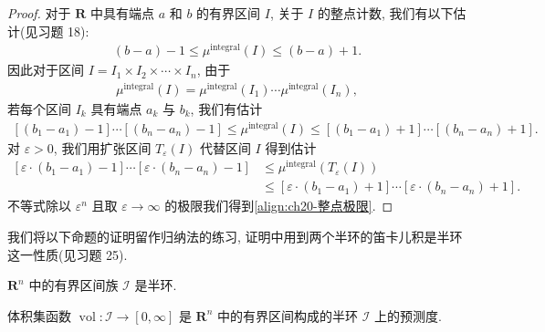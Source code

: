 \documentclass[../../main.tex]{subfiles}
\begin{document}
\begin{proof}
对于 $\mathbf{R}$ 中具有端点 $a$ 和 $b$ 的有界区间 $I$, 关于 $I$ 的整点计数, 我们有以下估计(见习题 18):
\begin{align}\label{align:ch20-一维整点估计}
(b-a)-1\leqslant\mu^{\operatorname{integral}}(I)\leqslant(b-a)+1.
\end{align}
因此对于区间 $I=I_{1}\times I_{2}\times\cdots\times I_{n}$, 由于
\begin{align*}
\mu^{\operatorname{integral}}(I)=\mu^{\operatorname{integral}}(I_{1})\cdots\mu^{\operatorname{integral}}(I_{n}),
\end{align*}
若每个区间 $I_{k}$ 具有端点 $a_{k}$ 与 $b_{k}$, 我们有估计
\begin{align}\label{align:ch20-n维整点估计}
[(b_{1}-a_{1})-1]\cdots[(b_{n}-a_{n})-1]\leqslant\mu^{\operatorname{integral}}(I)\leqslant[(b_{1}-a_{1})+1]\cdots[(b_{n}-a_{n})+1].
\end{align}
对 $\varepsilon>0$, 我们用扩张区间 $T_{\varepsilon}(I)$ 代替区间 $I$ 得到估计
\begin{align}\label{align:ch20-扩张整点估计}
[\varepsilon\cdot(b_{1}-a_{1})-1]\cdots[\varepsilon\cdot(b_{n}-a_{n})-1]&\leqslant\mu^{\operatorname{integral}}(T_{\varepsilon}(I))\\
&\leqslant[\varepsilon\cdot(b_{1}-a_{1})+1]\cdots[\varepsilon\cdot(b_{n}-a_{n})+1].\nonumber
\end{align}
不等式除以 $\varepsilon^{n}$ 且取 $\varepsilon\to\infty$ 的极限我们得到\eqref{align:ch20-整点极限}.
\end{proof}

我们将以下命题的证明留作归纳法的练习, 证明中用到两个半环的笛卡儿积是半环这一性质(见习题 25).

\begin{proposition}\label{proposition:ch20-区间半环}
$\mathbf{R}^{n}$ 中的有界区间族 $\mathcal{I}$ 是半环.
\end{proposition}

\begin{proposition}\label{proposition:ch20-体积预测度}
体积集函数 $\operatorname{vol}:\mathcal{I}\to[0,\infty]$ 是 $\mathbf{R}^{n}$ 中的有界区间构成的半环 $\mathcal{I}$ 上的预测度.
\end{proposition}
\end{document}
